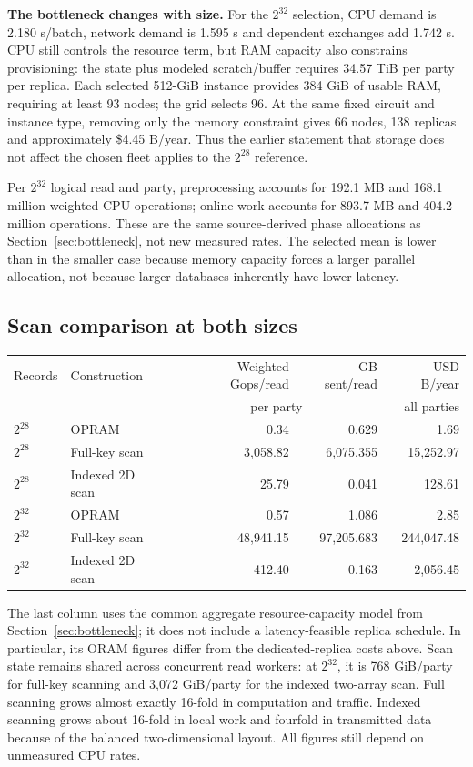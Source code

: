\textbf{The bottleneck changes with size.} For the $2^{32}$ selection, CPU demand
is 2.180 s/batch, network demand is 1.595 s and dependent exchanges
add 1.742 s. CPU still controls the resource term, but RAM capacity also
constrains provisioning: the state plus modeled scratch/buffer requires 34.57
TiB per party per replica. Each selected 512-GiB instance provides 384 GiB of
usable RAM, requiring at least 93 nodes; the grid selects 96. At the same fixed
circuit and instance type, removing only the memory constraint gives 66 nodes,
138 replicas and approximately \$4.45 B/year. Thus the earlier statement
that storage does not affect the chosen fleet applies to the $2^{28}$ reference.

Per $2^{32}$ logical read and party, preprocessing accounts for 192.1 MB and
168.1 million weighted CPU operations; online work accounts for 893.7 MB and
404.2 million operations. These are the same source-derived phase allocations
as Section~\ref{sec:bottleneck}, not new measured rates. The selected mean is lower than in the
smaller case because memory capacity forces a larger parallel allocation, not
because larger databases inherently have lower latency.

\subsection{Scan comparison at both sizes}
\begin{center}\small\begin{tabular}{llrrr}\toprule
Records & Construction & Weighted Gops/read & GB sent/read & USD B/year\\
&&\multicolumn{2}{c}{per party}&all parties\\\midrule
$2^{28}$ & OPRAM & 0.34 & 0.629 & 1.69 \\
$2^{28}$ & Full-key scan & 3,058.82 & 6,075.355 & 15,252.97 \\
$2^{28}$ & Indexed 2D scan & 25.79 & 0.041 & 128.61 \\
$2^{32}$ & OPRAM & 0.57 & 1.086 & 2.85 \\
$2^{32}$ & Full-key scan & 48,941.15 & 97,205.683 & 244,047.48 \\
$2^{32}$ & Indexed 2D scan & 412.40 & 0.163 & 2,056.45 \\
\bottomrule\end{tabular}\end{center}
The last column uses the common aggregate resource-capacity model from Section~\ref{sec:bottleneck};
it does not include a latency-feasible replica schedule. In particular, its ORAM
figures differ from the dedicated-replica costs above. Scan state remains shared
across concurrent read workers: at $2^{32}$, it is 768 GiB/party for full-key
scanning and 3,072 GiB/party for the indexed two-array scan. Full scanning grows
almost exactly 16-fold in computation and traffic. Indexed scanning grows about
16-fold in local work and fourfold in transmitted data because of the balanced
two-dimensional layout. All figures still depend on unmeasured CPU rates.
